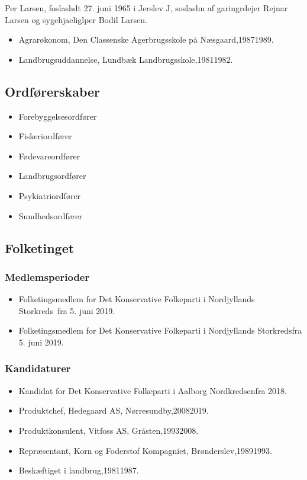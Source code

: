 \documentclass[11pt, a4paper]{awesome-cv}
\begin{document}
\makecvheader[R]
\makelettertitle
\begin{cvletter}
Per Larsen, foslashdt 27. juni 1965 i Jerslev J, soslashn af garingrdejer Rejnar Larsen og sygehjaeliglper Bodil Larsen.

\begin{itemize}
\item Agrarøkonom, Den Classenske Agerbrugsskole på Næsgaard,19871989.
\item Landbrugsuddannelse, Lundbæk Landbrugsskole,19811982.
\end{itemize}
\subsection*{Ordførerskaber}
\begin{itemize}
\item Forebyggelsesordfører
\item Fiskeriordfører
\item Fødevareordfører
\item Landbrugsordfører
\item Psykiatriordfører
\item Sundhedsordfører
\end{itemize}
\subsection*{Folketinget}
\subsubsection*{Medlemsperioder}
\begin{itemize}
\item Folketingsmedlem for Det Konservative Folkeparti i Nordjyllands Storkreds fra 5. juni 2019.
\item Folketingsmedlem for Det Konservative Folkeparti i Nordjyllands Storkredsfra 5. juni 2019.
\end{itemize}
\subsubsection*{Kandidaturer}
\begin{itemize}
\item Kandidat for Det Konservative Folkeparti i Aalborg Nordkredsenfra 2018.
\end{itemize}
\begin{itemize}
\item Produktchef, Hedegaard AS, Nørresundby,20082019.
\item Produktkonsulent, Vitfoss AS, Gråsten,19932008.
\item Repræsentant, Korn og Foderstof Kompagniet, Brønderslev,19891993.
\item Beskæftiget i landbrug,19811987.
\end{itemize}
\end{cvletter}
\end{document}
